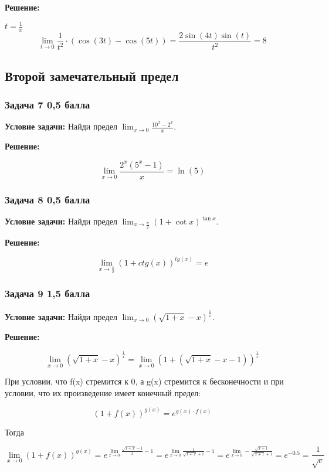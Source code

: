 \documentclass[a4paper,12pt]{article}
\begin{document}
\textbf{Решение: }

$t = \frac{1}{x}$
\[
\lim_{t \to 0} \frac{1}{t^2}\cdot (\cos(3t)-\cos(5t)) = \frac{2\sin(4t)\sin(t)}{t^2} = 8
\]

\vspace{1cm}

\subsection{Второй замечательный предел}

\subsubsection{Задача 7 \hfill 0,5 балла}
\textbf{Условие задачи:} Найди предел \( \lim_{x \to 0} \frac{10^x - 2^x}{x} \).

\textbf{Решение: } 

\[
\lim_{x \to 0}\frac{2^x(5^x-1)}{x}= \ln(5)
\]



\vspace{1cm}

\subsubsection{Задача 8 \hfill 0,5 балла}
\textbf{Условие задачи:} Найди предел \( \lim_{x \to \frac{\pi}{2}} (1 + \cot x)^{\tan x} \).

\textbf{Решение: } 

\[
\lim_{x \to \frac{\pi}{2}}(1+ctg(x))^{tg(x)} = e
\]

\vspace{1cm}

\subsubsection{Задача 9 \hfill 1,5 балла}
\textbf{Условие задачи:} Найди предел \( \lim_{x \to 0} (\sqrt{1 + x} - x)^{\frac{1}{x}} \).

\textbf{Решение: }

\[
\lim_{x \to 0} (\sqrt{1+x} - x)^{\frac{1}{x}} = \lim_{x \to 0} (1+ (\sqrt{1+x} - x-1))^{\frac{1}{x}}
\]

При условии, что f(x) стремится к 0, а g(x) стремится к бесконечности и при условии, что их произведение имеет конечный предел:

\[
(1+f(x))^{g(x)} = e^{g(x)\cdot f(x)}
\]


Тогда

\[
\lim_{x \to 0}(1+f(x))^{g(x)} = e^{\lim_{x \to 0} \frac{\sqrt{1+x}-1}{x}-1} = e^{\lim_{x \to 0} \frac{1}{\sqrt{1+x}+1}-1}=e^{\lim_{x \to 0} -\frac{\sqrt{x+1}}{\sqrt{x+1}+1}} = e^{-0.5} = \frac{1}{\sqrt{e}}
\]
\end{document}
